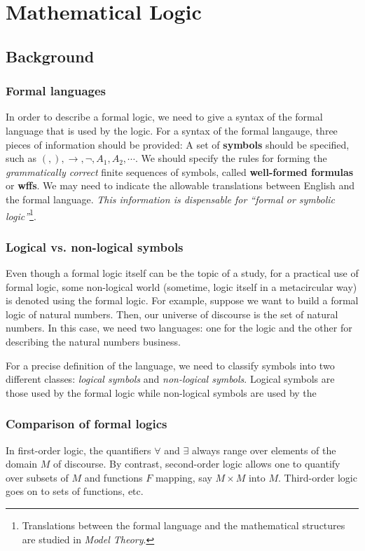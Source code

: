 \chapter{Mathematical Logic}

\section{Background}

\subsection{Formal languages}
In order to describe a formal logic, we need to give a syntax of the formal
language that is used by the logic.
For a syntax of the formal langauge, three pieces of information
should be provided:
\ben
\w A set of {\bf symbols} should be specified,
  such as $(, ), \rightarrow, \neg, A_1, A_2, \cdots$.
\w We should specify the rules for forming the 
     {\em{}grammatically correct\/} finite sequences of symbols, 
     called {\bf{}well-formed formulas}
     or {\bf{}wffs}.
\w We may need to indicate the allowable translations between
   English and the formal language. {\em{}This information is
   dispensable for ``formal or symbolic logic''\/}\footnote{Translations 
   between the formal language and the
  mathematical structures are studied in {\em{}Model Theory\/}.}.
\een

\subsection{Logical vs. non-logical symbols}
Even though a formal logic itself can be the topic of a study, 
for a practical use of formal logic, some non-logical world (sometime, logic
itself in a metacircular way) is denoted using the formal logic.
For example, suppose we want to build a formal logic of natural numbers.
Then, our universe of discourse is the set of natural numbers.
In this case, we need two languages: one for the logic and the other
for describing the natural numbers business.

For a precise definition of the language, we need to classify symbols into
two different classes: {\em logical symbols\/} and {\em non-logical
  symbols\/}. Logical symbols are those used by the formal logic
while non-logical symbols are used by the 


\subsection{Comparison of formal logics}
In first-order logic, the quantifiers $\forall$ and $\exists$ always range
over elements of the domain $M$ of discourse.
By contrast, second-order logic allows one to quantify over subsets of $M$ and
functions $F$ mapping, say $M \times M$ into $M$.  Third-order logic goes on
to sets of functions, etc.

